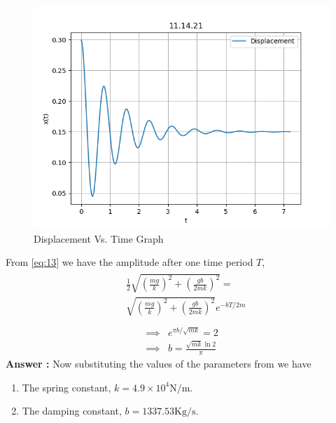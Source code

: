 \documentclass[journal,12pt,twocolumn]{IEEEtran}
\theoremstyle{remark}
\begin{document}
\begin{enumerate}
\begin{figure}[h]
    \centering
    \includegraphics[width=01\columnwidth]{11.14.21_plot.png}
    \caption{Displacement  Vs. Time Graph}
    \label{fig:Fig-2}
\end{figure}
From \eqref{eq:13} we have the amplitude after one time period $T$,
\begin{align}
\begin{split}
&\frac{1}{2}\sqrt{\left(\frac{mg}{k}\right)^2+\left(\frac{gb}{2mk}\right)^2}= \\
&\sqrt{\left(\frac{mg}{k}\right)^2+\left(\frac{gb}{2mk}\right)^2}e^{-bT/2m} \label{eq:14}\\
\end{split}
\end{align}
\begin{align}
\implies &e^{\pi b/\sqrt{mk}}=2 \label{eq:15}\\
\implies &b=\frac{\sqrt{mk}\ln{2}}{\pi} \label{eq:16}
\end{align}
\textbf{Answer :}
Now substituting the values of the parameters from  we have \\
\begin{enumerate}
\item  The spring constant, $k=4.9\times10^4 \text{N/m}$.
\item  The damping constant, $b=1337.53 \text{Kg/s}$.
\end{enumerate} 
\end{enumerate}
\end{document}
